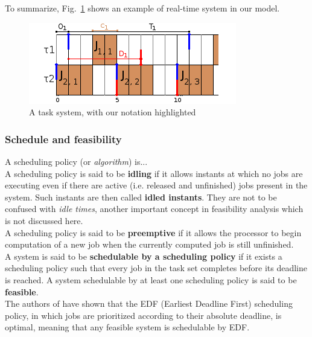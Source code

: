 \documentclass[a4paper,10pt]{article}
\begin{document}
        To summarize, Fig.~\ref{fig:rt_ex} shows an example of real-time system in our model.

        \begin{figure}[H]
        \begin{center}
            \includegraphics{figs/RTsystem_example.png}
            \caption{A task system, with our notation highlighted}
            \label{fig:rt_ex}
        \end{center}
        \end{figure}


        \subsubsection{Schedule and feasibility}

        A scheduling policy (or \emph{algorithm}) is...\\

        A scheduling policy is said to be \textbf{idling} if it allows instants at which no jobs are executing even if there are active (i.e. released and unfinished) jobs present in the system. Such instants are then called \textbf{idled instants}. They are not to be confused with \emph{idle times}, another important concept in feasibility analysis which is not discussed here.\\

        A scheduling policy is said to be \textbf{preemptive} if it allows the processor to begin computation of a new job when the currently computed job is still unfinished.\\

        A system is said to be \textbf{schedulable by a scheduling policy} if it exists a scheduling policy such that every job in the task set completes before its deadline is reached. A system schedulable by at least one scheduling policy is said to be \textbf{feasible}.\\

        The authors of \cite{liu1973scheduling} have shown that the EDF (Earliest Deadline First) scheduling policy, in which jobs are prioritized according to their absolute deadline, is optimal, meaning that any feasible system is schedulable by EDF.
\end{document}
